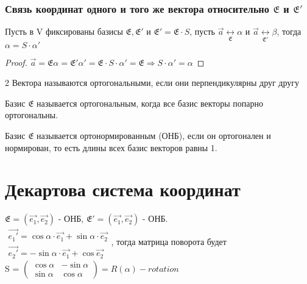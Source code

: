 	\subsubsection{Связь координат одного и того же вектора относительно \(\mathfrak{E}\) и \(\mathfrak{E'}\)}
	\begin{proposition}
		Пусть в V фиксированы базисы $\mathfrak{E}, \mathfrak{E'}$ и \(\mathfrak{E'} = \mathfrak{E}\cdot S\), пусть $\vec{a}\underset{\mathfrak{E}}{\longleftrightarrow}\alpha$ и 
		$\vec{a}\underset{\mathfrak{E'}}{\longleftrightarrow}\beta$, тогда \(\alpha = S\cdot \alpha'\)
	\end{proposition}
	\begin{proof}
		$\vec{a} = \mathfrak{E}\alpha = \mathfrak{E'}\alpha' = \mathfrak{E}\cdot S\cdot \alpha' = \mathfrak{E} \Longrightarrow S\cdot \alpha' = \alpha$
	\end{proof}
	\begin{definition}
		2 Вектора называются ортогональными, если они перпендикулярны друг другу
	\end{definition}
	\begin{definition}
		Базис $\mathfrak{E}$ называется ортогональным, когда все базис векторы попарно ортогональны.
	\end{definition}
	\begin{definition}
		Базис $\mathfrak{E}$ называется ортонормированным (ОНБ), если он ортогонален и нормирован, то есть длины всех базис векторов равны 1.
	\end{definition}
	\section{Декартова система координат}
	
	\(\mathfrak{E} = (\vec{e_1}, \vec{e_2})\) - ОНБ, \(\mathfrak{E'} = (\vec{e_1}, \vec{e_2})\) - ОНБ. \\
	\(\begin{gathered}
		\vec{e_1'} = \cos\alpha\cdot\vec{e_1} + \sin\alpha\cdot\vec{e_2} \\
		\vec{e_2'} = -\sin\alpha\cdot\vec{e_1} + \cos \vec{e_2} 
	\end{gathered}\), тогда матрица поворота будет \\ S = \(\begin{pmatrix}
	\cos\alpha  & -\sin\alpha \\
	\sin \alpha & \cos \alpha
	\end{pmatrix} = R(\alpha) - rotation\)

